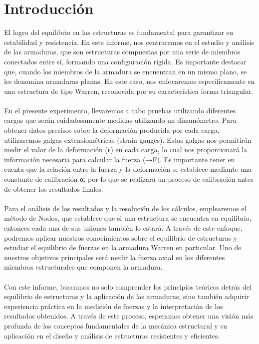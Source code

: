 \documentclass[
	spanish, %
	oneside
]{article}
\begin{document}
\section{Introducción}
El logro del equilibrio en las estructuras es fundamental para garantizar su estabilidad y resistencia. En este informe, nos centraremos en el estudio y análisis de las armaduras, que son estructuras compuestas por una serie de miembros conectados entre sí, formando una configuración rígida. Es importante destacar que, cuando los miembros de la armadura se encuentran en un mismo plano, se les denomina armaduras planas. En este caso, nos enfocaremos específicamente en una estructura de tipo Warren, reconocida por su característica forma triangular. \\ \\ 
En el presente experimento, llevaremos a cabo pruebas utilizando diferentes cargas que serán cuidadosamente medidas utilizando un dinamómetro. Para obtener datos precisos sobre la deformación producida por cada carga, utilizaremos galgas extensiométricas (strain gauges). Estas galgas nos permitirán medir el valor de la deformación (ϵ) en cada carga, lo cual nos proporcionará la información necesaria para calcular la fuerza (→F). Es importante tener en cuenta que la relación entre la fuerza y la deformación se establece mediante una constante de calibración α, por lo que se realizará un proceso de calibración antes de obtener los resultados finales. \\ \\
Para el análisis de los resultados y la resolución de los cálculos, emplearemos el método de Nodos, que establece que si una estructura se encuentra en equilibrio, entonces cada una de sus uniones también lo estará. A través de este enfoque, podremos aplicar nuestros conocimientos sobre el equilibrio de estructuras y estudiar el equilibrio de fuerzas en la armadura Warren en particular. Uno de nuestros objetivos principales será medir la fuerza axial en los diferentes miembros estructurales que componen la armadura. \\ \\
Con este informe, buscamos no solo comprender los principios teóricos detrás del equilibrio de estructuras y la aplicación de las armaduras, sino también adquirir experiencia práctica en la medición de fuerzas y la interpretación de los resultados obtenidos. A través de este proceso, esperamos obtener una visión más profunda de los conceptos fundamentales de la mecánica estructural y su aplicación en el diseño y análisis de estructuras resistentes y eficientes. 
\end{document}
